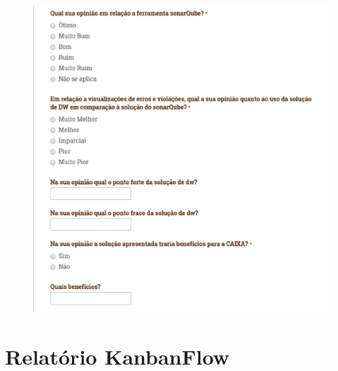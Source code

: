 \begin{apendicesenv}
\begin{figure}[h!]
\centering
\includegraphics[keepaspectratio=false,scale=0.60]{figuras/figuras_nilton/questionario4.eps}
\label{questionario4}
\end{figure}

\chapter{Relatório KanbanFlow}
\label{sec:kanban}


\end{apendicesenv}
